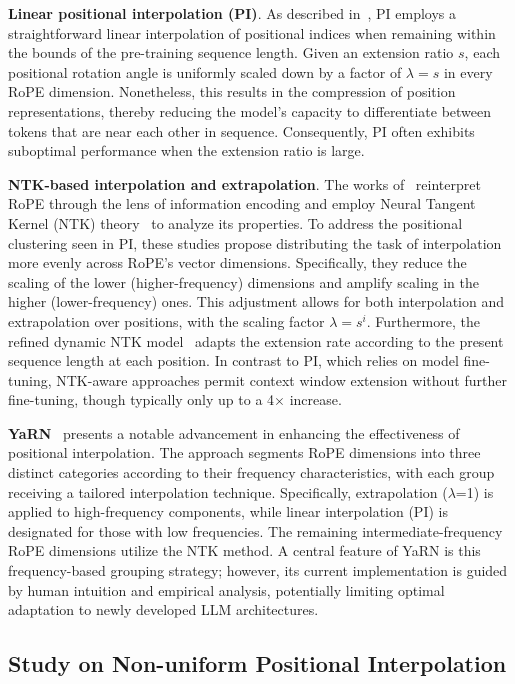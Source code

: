 \textbf{Linear positional interpolation (PI)}. As described in~\cite{pi}, PI employs a straightforward linear interpolation of positional indices when remaining within the bounds of the pre-training sequence length. Given an extension ratio $s$, each positional rotation angle is uniformly scaled down by a factor of $\lambda = s$ in every RoPE dimension. Nonetheless, this results in the compression of position representations, thereby reducing the model's capacity to differentiate between tokens that are near each other in sequence. Consequently, PI often exhibits suboptimal performance when the extension ratio is large.

\textbf{NTK-based interpolation and extrapolation}. The works of~\cite{ntk,dynamicntk} reinterpret RoPE through the lens of information encoding and employ Neural Tangent Kernel (NTK) theory~\cite{jacot2018neural,tancik2020fourier} to analyze its properties. To address the positional clustering seen in PI, these studies propose distributing the task of interpolation more evenly across RoPE’s vector dimensions. Specifically, they reduce the scaling of the lower (higher-frequency) dimensions and amplify scaling in the higher (lower-frequency) ones. This adjustment allows for both interpolation and extrapolation over positions, with the scaling factor $\lambda = s^{i}$. Furthermore, the refined dynamic NTK model~\cite{dynamicntk} adapts the extension rate according to the present sequence length at each position. In contrast to PI, which relies on model fine-tuning, NTK-aware approaches permit context window extension without further fine-tuning, though typically only up to a 4$\times$ increase.

\textbf{YaRN}~\cite{yarn} presents a notable advancement in enhancing the effectiveness of positional interpolation. The approach segments RoPE dimensions into three distinct categories according to their frequency characteristics, with each group receiving a tailored interpolation technique. Specifically, extrapolation ($\lambda$=1) is applied to high-frequency components, while linear interpolation (PI) is designated for those with low frequencies. The remaining intermediate-frequency RoPE dimensions utilize the NTK method. A central feature of YaRN is this frequency-based grouping strategy; however, its current implementation is guided by human intuition and empirical analysis, potentially limiting optimal adaptation to newly developed LLM architectures.

\subsection{Study on Non-uniform Positional Interpolation}

